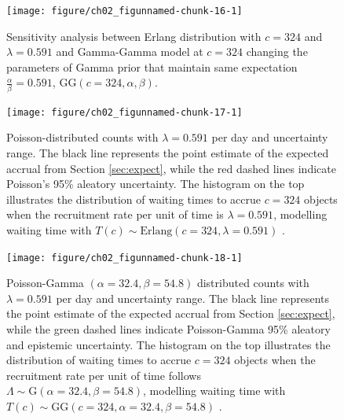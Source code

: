 \begin{figure}
\begin{knitrout}
\color{fgcolor}

{\centering \texttt{[image: figure/ch02\_figunnamed-chunk-16-1]} 

}


\end{knitrout}
	\caption{Sensitivity analysis between Erlang distribution with $c = 324$ and $\lambda = 0.591$ and Gamma-Gamma model at $c = 324$ changing the parameters of Gamma prior that maintain same expectation $\frac{\alpha}{\beta} = 0.591$, $\textrm{GG}(c=324,\alpha, \beta)$.}
  \label{fig:2_6a}
\end{figure}



\begin{figure}
\begin{knitrout}
\color{fgcolor}

{\centering \texttt{[image: figure/ch02\_figunnamed-chunk-17-1]} 

}


\end{knitrout}
  \caption{Poisson-distributed counts with $\lambda = 0.591$ per day and uncertainty range. The black line represents the point estimate of the expected accrual from Section \ref{sec:expect}, while the red dashed lines indicate Poisson's 95\% aleatory uncertainty. The histogram on the top illustrates the distribution of waiting times to accrue $c=324$ objects when the recruitment rate per unit of time is $\lambda = 0.591$, modelling waiting time with $T(c)\sim \textrm{Erlang} (c=324, \lambda = 0.591)$ \citep{spiegelhalter2011visualizing, pkgacc}.}
  \label{fig:2_13}
\end{figure}


\begin{figure}
\begin{knitrout}
\color{fgcolor}

{\centering \texttt{[image: figure/ch02\_figunnamed-chunk-18-1]} 

}


\end{knitrout}
  \caption{Poisson-Gamma $(\alpha = 32.4, \beta = 54.8)$ distributed counts with $\lambda = 0.591$ per day and uncertainty range. The black line represents the point estimate of the expected accrual from Section \ref{sec:expect}, while the green dashed lines indicate Poisson-Gamma 95\% aleatory and epistemic uncertainty. The histogram on the top illustrates the distribution of waiting times to accrue $c=324$ objects when the recruitment rate per unit of time follows $\Lambda \sim \textrm{G}(\alpha = 32.4, \beta = 54.8)$, modelling waiting time with $T(c)\sim \textrm{GG} (c=324, \alpha = 32.4, \beta = 54.8)$ \citep{spiegelhalter2011visualizing, pkgacc}.}
  \label{fig:2_14}
\end{figure}
